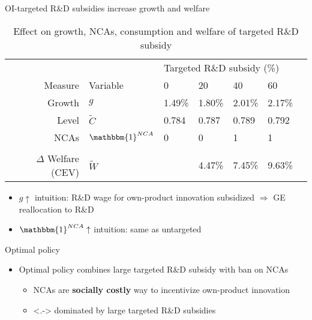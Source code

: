 \documentclass[english,usenames,dvipsnames]{beamer}
\begin{document}
\begin{frame}{OI-targeted R\&D subsidies increase growth and welfare}\label{OI_RDsubsidy_table}
	\begin{table}
		\centering
		\caption*{Effect on growth, NCAs, consumption and welfare of targeted R\&D subsidy}
		\small
		\begin{tabular}{rllllll}
			\toprule \toprule
			 &  & \multicolumn{4}{l}{Targeted R\&D subsidy (\%)} \vspace{3pt} \tabularnewline
			Measure &Variable & 0 & 20 & 40 & 60 \tabularnewline
			\midrule
			Growth & $g$ & 1.49\% & 1.80\% & 2.01\% & 2.17\% \tabularnewline
			Level & $\tilde{C}$  & 0.784 &  0.787 & 0.789 & 0.792 \tabularnewline 
			NCAs & $\mathbbm{1}^{NCA}$ & 0 & 0 & 1 & 1 \tabularnewline
			\tabularnewline
			$\Delta$ Welfare (CEV) & $\tilde{W}$  &  & 4.47\% & 7.45\% & 9.63\% \tabularnewline
			\bottomrule
		\end{tabular}
	\end{table}
	\hyperlink{oi_rd_subsidies:decomposition_growth_decrease}{}
	\hyperlink{plots:oi_rd_subsidies1}{} \hyperlink{plots:oi_rd_subsidies2}{}	
	\hyperlink{OI_RDsubsidy_intuition}{}
	\begin{itemize}
		\small
		\item $g \uparrow$ intuition: R\&D wage for own-product innovation subsidized $\Rightarrow$ GE reallocation to R\&D
		\item $\mathbbm{1}^{NCA} \uparrow$ intuition: same as untargeted
	\end{itemize}	
\end{frame}

\begin{frame}{Optimal policy}\label{all_policies_overview}
	\begin{itemize}
		\item <+-> Optimal policy combines large targeted R\&D subsidy with ban on NCAs \hyperlink{plots:all_policies}{} 
		\begin{itemize}
			\item<+-> NCAs are \alert{\textbf{socially costly}} way to incentivize own-product innovation
			\item<.-> dominated by large targeted R\&D subsidies 	\hyperlink{intuition:all_policies}{}
		\end{itemize}
	\end{itemize}
\end{frame}
\end{document}

